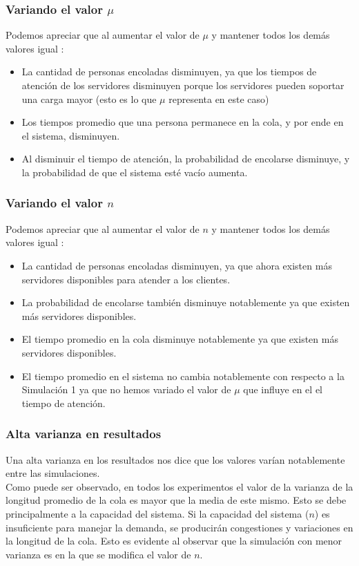 \documentclass[11pt]{article}
\begin{document}
    \subsubsection{Variando el valor $\mu$}
    Podemos apreciar que al aumentar el valor de $\mu$ y mantener todos los demás valores igual :
     \begin{itemize}
        \item La cantidad de personas encoladas disminuyen, ya que los tiempos de atención de los servidores disminuyen porque los servidores pueden soportar una carga mayor (esto es lo que $\mu$ representa en este caso)
        \item Los tiempos promedio que una persona permanece en la cola, y por ende en el sistema, disminuyen.
        \item Al disminuir el tiempo de atención, la probabilidad de encolarse disminuye, y la probabilidad de que el sistema esté vacío aumenta.
    \end{itemize}

    \subsubsection{Variando el valor $n$}
    Podemos apreciar que al aumentar el valor de $n$ y mantener todos los demás valores igual :
     \begin{itemize}
        \item La cantidad de personas encoladas disminuyen, ya que ahora existen más servidores disponibles para atender a los clientes.
        \item La probabilidad de encolarse también disminuye notablemente ya que existen más servidores disponibles.
         \item El tiempo promedio en la cola disminuye notablemente ya que existen más servidores disponibles.
         \item El tiempo promedio en el sistema no cambia notablemente con respecto a la Simulación 1 ya que no hemos variado el valor de $\mu$ que influye en el el tiempo de atención.
    \end{itemize}

    \subsubsection{Alta varianza en resultados}
    Una alta varianza en los resultados nos dice que los valores varían notablemente entre las simulaciones.\\
    Como puede ser observado, en todos los experimentos el valor de la varianza de la longitud promedio de la cola es mayor que la media de este mismo.
    Esto se debe principalmente a la capacidad del sistema. Si la capacidad del sistema ($n$) es insuficiente para manejar la demanda, se producirán congestiones
    y variaciones en la longitud de la cola. Esto es evidente al observar que la simulación con menor varianza es en la que se modifica el valor de $n$.
\end{document}
